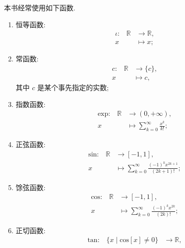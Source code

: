 \begin{definition}
    本书经常使用如下函数.
    \begin{enumerate}
        \item 恒等函数:
              \begin{align*}
                  \text{$\iota$:} \quad
                  \mathbb{R} & \to \mathbb{R}, \\
                  x          & \mapsto x;
              \end{align*}
        \item 常函数:
              \begin{align*}
                  \text{$c$:} \quad
                  \mathbb{R} & \to \{ c \}, \\
                  x          & \mapsto c,
              \end{align*}
              其中 $c$ 是某个事先指定的实数;
        \item 指数函数:
              \begin{align*}
                  \text{$\mathrm{exp}$:} \quad
                  \mathbb{R} & \to (0, +\infty),                               \\
                  x          & \mapsto \sum_{k = 0}^{\infty} {\frac{x^k}{k!}};
              \end{align*}
        \item 正弦函数:
              \begin{align*}
                  \text{$\mathrm{sin}$:} \quad
                  \mathbb{R} & \to [-1, 1],                                                     \\
                  x          & \mapsto \sum_{k = 0}^{\infty} {\frac{(-1)^k x^{2k+1}}{(2k+1)!}};
              \end{align*}
        \item 馀弦函数:
              \begin{align*}
                  \text{$\mathrm{cos}$:} \quad
                  \mathbb{R} & \to [-1, 1],                                                 \\
                  x          & \mapsto \sum_{k = 0}^{\infty} {\frac{(-1)^k x^{2k}}{(2k)!}};
              \end{align*}
        \item 正切函数:
              \begin{align*}
                  \text{$\mathrm{tan}$:} \quad
                  \{ x \mid \mathrm{cos} {[x]} \neq 0 \} & \to \mathbb{R},                                        \\

\end{align*}
\end{enumerate}
\end{definition}
